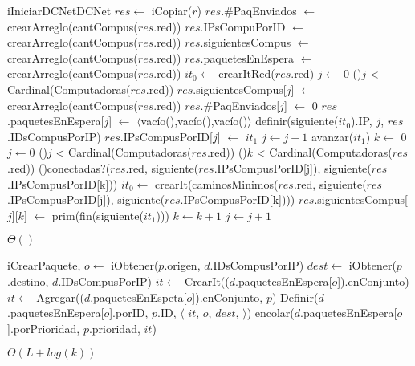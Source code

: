 \begin{Algoritmos}

  \begin{algoritmo}{iIniciarDCNet}{}{DCNet}
    $res \gets$ iCopiar($r$)   
    $res$.\#PaqEnviados $\gets$ crearArreglo(cantCompus($res$.red))   
    $res$.IPsCompuPorID $\gets$ crearArreglo(cantCompus($res$.red))   
    $res$.siguientesCompus $\gets$ crearArreglo(cantCompus($res$.red))   
    $res$.paquetesEnEspera $\gets$ crearArreglo(cantCompus($res$.red))   
     $it_{0} \gets$ crearItRed($res$.red)   
     $j \gets$ 0   
    \While(){$j$ < Cardinal(Computadoras($res$.red))}{
      $res$.siguientesCompus[$j$] $\gets$ crearArreglo(cantCompus($res$.red))   
      $res$.\#PaqEnviados[$j$] $\gets$ 0   
      $res$.paquetesEnEspera[$j$] $\gets$ $\langle$vac\'{i}o(),vac\'{i}o(),vac\'{i}o()$\rangle$   
      definir(siguiente($it_{0}$).IP, $j$, $res$.IDsCompusPorIP)   
      $res$.IPsCompusPorID[$j$] $\gets$ $it_{1}$   
      $j \gets j + 1$   
      avanzar($it_{1}$)   
    }
     $k \gets$ 0   
    $j \gets 0$   
    \While(){$j$ < Cardinal(Computadoras($res$.red))}{
      \While(){$k$ < Cardinal(Computadoras($res$.red))}{
        \If(){conectadas?($res$.red, siguiente($res$.IPsCompusPorID[j]), siguiente($res$.IPsCompusPorID[k]))}{
           $it_{0} \gets$ crearIt(caminosMinimos($res$.red, siguiente($res$.IPsCompusPorID[j]), siguiente($res$.IPsCompusPorID[k])))\;
          $res$.siguientesCompus[$j$][$k$] $\gets$ prim(fin(siguiente($it_{1}$)))   
        }
        $k \gets k + 1$  
      }
      $j \gets j + 1$  
    }
  \end{algoritmo}
 \datosAlgoritmo{} %
  {} %
  {} %
  {$\Theta()$} %
  {} %


  \begin{algoritmo}{iCrearPaquete}{,}{}
     $o \gets$ iObtener($p$.origen, $d$.IDsCompusPorIP)
     $dest \gets$ iObtener($p$.destino, $d$.IDsCompusPorIP)
    $it \gets$ CrearIt(($d$.paquetesEnEspera[$o$]).enConjunto)
    $it \gets$ Agregar(($d$.paquetesEnEspeta[$o$]).enConjunto, $p$)
    Definir($d$.paquetesEnEspera[$o$].porID, $p$.ID, $\langle$ $it$, $o$, $dest$, $\rangle$)
    encolar($d$.paquetesEnEspera[$o$].porPrioridad, $p$.prioridad, $it$)
    \end{algoritmo}
  \datosAlgoritmo{} %
  {} %
  {} %
  {$\Theta(L+log(k))$} %
  {} %


\end{Algoritmos}
